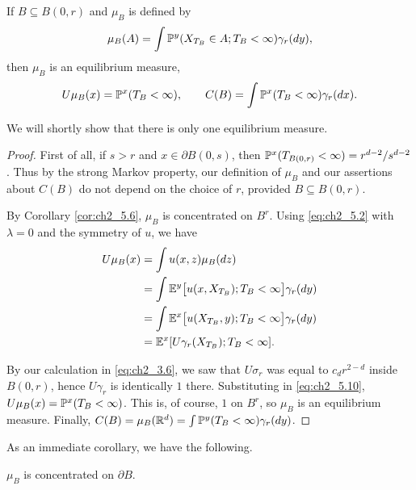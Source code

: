 \begin{proposition}\label{prop:ch2_5.8}
If $B \subseteq B(0,r)$ and $\mu_B$ is defined by
\begin{equation}\label{eq:ch2_5.8}
    \mu_B(A) = \int \P^y(X_{T_B} \in A; T_B < \infty)\gamma_r(dy),
\end{equation}
\mnewpage
then $\mu_B$ is an equilibrium measure,
\begin{equation}\label{eq:ch2_5.9}
    U\mu_B(x) = \P^x(T_B < \infty), \qquad C(B) = \int \P^x(T_B < \infty)\gamma_r(dx).
\end{equation}
\end{proposition}

We will shortly show that there is only one equilibrium measure.

\begin{proof}
First of all, if $s > r$ and $x \in \partial B(0,s)$, then $\P^x(T_{B(0,r)} < \infty) = r^{d-2}/s^{d-2}$. Thus by the strong Markov property, our definition of $\mu_B$ and our assertions about $C(B)$ do not depend on the choice of $r$, provided $B \subseteq B(0,r)$.


By Corollary \ref{cor:ch2_5.6}, $\mu_B$ is concentrated on $B^r$. Using \eqref{eq:ch2_5.2} with $\lambda = 0$ and the symmetry of $u$, we have
\begin{align}\label{eq:ch2_5.10}
    U\mu_B(x) &= \int u(x,z)\mu_B(dz) \\
    &= \int \E^y\big[u(x,X_{T_B}); T_B < \infty\big]\gamma_r(dy) \notag \\
    &= \int \E^x\big[u(X_{T_B},y); T_B < \infty\big]\gamma_r(dy) \notag \\
    &= \E^x[U\gamma_r(X_{T_B}); T_B < \infty]. \notag
\end{align}

By our calculation in \eqref{eq:ch2_3.6}, we saw that $U\sigma_r$ was equal to $c_dr^{2-d}$ inside $B(0,r)$, hence $U\gamma_r$ is identically $1$ there. Substituting in \eqref{eq:ch2_5.10}, $U\mu_B(x) = \P^x(T_B < \infty)$. This is, of course, $1$ on $B^r$, so $\mu_B$ is an equilibrium measure. Finally, $C(B) = \mu_B(\R^d) = \int \P^y(T_B < \infty)\gamma_r(dy)$.
\end{proof}

As an immediate corollary, we have the following.

\begin{corollary}\label{cor:ch2_5.9}
    $\mu_B$ is concentrated on $\partial B$.
\end{corollary}

